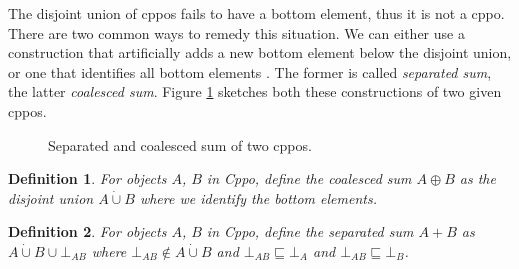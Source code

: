 \documentclass[a4paper]{article}
\newcommand{\below}{\sqsubseteq}
\newtheorem{definition}{Definition}[section]
\begin{document}
The disjoint union of cppos fails to have a bottom element, thus it is not a
cppo. There are two common ways to remedy this situation. We can either use a
construction that artificially adds a new bottom element below the disjoint
union, or one that identifies all bottom elements \cite{Gunter1992}. The former
is called \emph{separated sum}, the latter \emph{coalesced sum}.  Figure
\ref{figSeparatedAndCoalescedSum} sketches both these constructions of two given cppos.

\begin{figure}[ht]
\begin{center}


\end{center}
\caption{Separated and coalesced sum of two cppos.} \label{figSeparatedAndCoalescedSum}
\end{figure}

\begin{definition} \label{defCoalescedSum}
For objects $A$, $B$ in Cppo, define the \emph{coalesced sum} $A \oplus B$ as
the disjoint union $A \dot\cup B$ where we identify the bottom elements.
\end{definition}

\begin{definition} \label{defSeparatedSum}
For objects $A$, $B$ in Cppo, define the \emph{separated sum} $A + B$ as $A
\dot\cup B \cup \bot_{AB}$ where $\bot_{AB} \not\in A \dot\cup B$ and $\bot_{AB}
\below \bot_A$ and $\bot_{AB} \below \bot_B$.
\end{definition}
\end{document}
